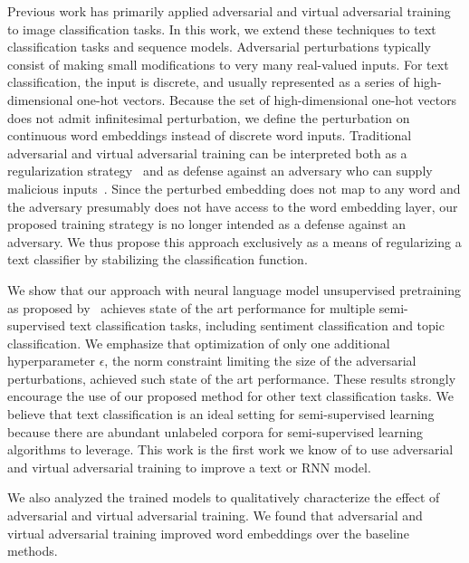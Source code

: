 \documentclass{article}
\begin{document}
Previous work has primarily applied adversarial and virtual adversarial training to image
classification tasks.
In this work, we extend these techniques to text
classification tasks and sequence models.
Adversarial perturbations typically consist of making small modifications to very
many real-valued inputs.
For text classification, the input is discrete, and usually represented as
a series of high-dimensional one-hot vectors.
Because the set of high-dimensional one-hot vectors does not admit infinitesimal
perturbation, we define the perturbation on continuous word embeddings instead of discrete
word inputs.
Traditional adversarial and virtual adversarial training can be interpreted both as a regularization
strategy~\cite[]{szegedy2013intriguing, goodfellow2014explaining,
miyato2015distributional} and as defense against an adversary who can supply
malicious inputs~\cite[]{szegedy2013intriguing,goodfellow2014explaining}.
Since the perturbed embedding does not map to any word and the adversary
presumably does not have access to the word embedding layer,
our proposed training strategy is no longer intended as a defense against an
adversary. 
We thus propose this approach exclusively as a means of regularizing a text
classifier by stabilizing the classification function.

We show that our approach with neural language model
unsupervised pretraining as proposed by~\citet{dai2015semi} achieves state of the art performance for multiple
semi-supervised text classification tasks, including sentiment classification and topic classification.
We emphasize that optimization of only one additional
hyperparameter $\epsilon$, the norm constraint
limiting the size of the adversarial perturbations, achieved such state of the art performance.
These results strongly encourage the use of our proposed method for other text classification
tasks.
We believe that text classification is an ideal setting for semi-supervised learning
because there are abundant unlabeled corpora for semi-supervised learning algorithms to leverage.
This work is the first work we know of to use adversarial and virtual
adversarial training to improve a text or RNN model.

We also analyzed the trained models to qualitatively characterize the effect of
adversarial and virtual adversarial training.
We found that adversarial and virtual adversarial training improved
word embeddings over the baseline methods.
\end{document}
